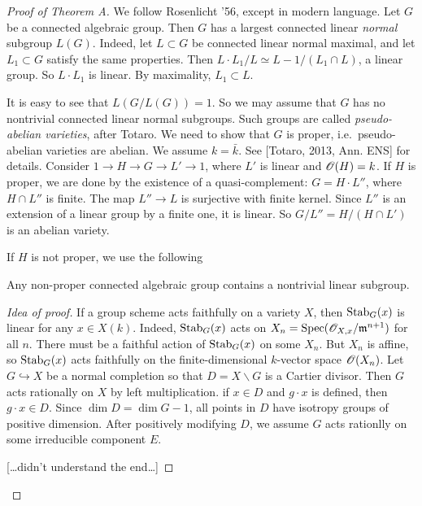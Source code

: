 \begin{proof}[Proof of Theorem A]
We follow Rosenlicht '56, except in modern language. Let $G$ be a connected 
algebraic group. Then $G$ has a largest connected linear \emph{normal} subgroup 
$L(G)$. Indeed, let $L\subset G$ be connected linear normal maximal, and let 
$L_1\subset G$ satisfy the same properties. Then 
$L\cdot L_1 /L\simeq L-1/(L_1\cap L)$, a linear group. So $L\cdot L_1$ is linear. 
By maximality, $L_1\subset L$. 

It is easy to see that $L(G/L(G))=1$. So we may assume that $G$ has no 
nontrivial connected linear normal subgroups. Such groups are called 
\emph{pseudo-abelian varieties}, after Totaro. We need to show that 
$G$ is proper, i.e.\ pseudo-abelian varieties are abelian. We assume $k=\bar k$. 
See [Totaro, 2013, Ann. ENS] for details. Consider 
$1 \to H \to G \to L' \to 1$, where $L'$ is linear and $\mathscr{O}(H)=k$. If $H$ is 
proper, we are done by the existence of a quasi-complement: 
$G=H\cdot L''$, where $H\cap L''$ is finite. The map $L'' \to L$ is surjective 
with finite kernel. Since $L''$ is an extension of a linear group by a finite 
one, it is linear. So $G/L''=H/(H\cap L')$ is an abelian variety. 

If $H$ is not proper, we use the following 

\begin{lemm}[Rosenlicht]
Any non-proper connected algebraic group contains a nontrivial linear subgroup. 
\end{lemm}
\begin{proof}[Idea of proof]
If a group scheme acts faithfully on a variety $X$, then 
$\operatorname{Stab}_G(x)$ is linear for any $x\in X(k)$. Indeed, $\operatorname{Stab}_G(x)$ 
acts on $X_n=\operatorname{Spec}(\mathscr{O}_{X,x}/\mathfrak{m}^{n+1})$ for all $n$. There must be a 
faithful action of $\operatorname{Stab}_G(x)$ on some $X_n$. But $X_n$ is affine, 
so $\operatorname{Stab}_G(x)$ acts faithfully on the finite-dimensional $k$-vector 
space $\mathscr{O}(X_n)$. Let $G\hookrightarrow X$ be a normal completion so that 
$D=X\smallsetminus G$ is a Cartier divisor. Then $G$ acts rationally on 
$X$ by left multiplication. if $x\in D$ and 
$g\cdot x$ is defined, then $g\cdot x\in D$. Since 
$\dim D=\dim G-1$, all points in $D$ have  
isotropy groups of positive dimension. After positively modifying $D$, we 
assume $G$ acts rationlly on some irreducible component $E$. 

[\ldots didn't understand the end\ldots]
\end{proof}
\end{proof}


